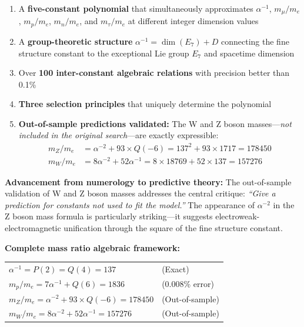 \documentclass[11pt,a4paper]{article}
\begin{document}
\begin{enumerate}
    \item A \textbf{five-constant polynomial} that simultaneously approximates $\alpha^{-1}$, $m_\mu/m_e$, $m_p/m_e$, $m_n/m_e$, and $m_\tau/m_e$ at different integer dimension values
    
    \item A \textbf{group-theoretic structure} $\alpha^{-1} = \dim(E_7) + D$ connecting the fine structure constant to the exceptional Lie group $E_7$ and spacetime dimension
    
    \item Over \textbf{100 inter-constant algebraic relations} with precision better than 0.1\%
    
    \item \textbf{Three selection principles} that uniquely determine the polynomial
    
    \item \textbf{Out-of-sample predictions validated:} The W and Z boson masses---\textit{not included in the original search}---are exactly expressible:
    \begin{align*}
    m_Z/m_e &= \alpha^{-2} + 93 \times Q(-6) = 137^2 + 93 \times 1717 = 178450 \\
    m_W/m_e &= 8\alpha^{-2} + 52\alpha^{-1} = 8 \times 18769 + 52 \times 137 = 157276
    \end{align*}
\end{enumerate}

\textbf{Advancement from numerology to predictive theory:} The out-of-sample validation of W and Z boson masses addresses the central critique: \textit{``Give a prediction for constants not used to fit the model.''} The appearance of $\alpha^{-2}$ in the Z boson mass formula is particularly striking---it suggests electroweak-electromagnetic unification through the square of the fine structure constant.

\textbf{Complete mass ratio algebraic framework:}
\begin{center}
\begin{tabular}{ll}
$\alpha^{-1} = P(2) = Q(4) = 137$ & (Exact) \\
$m_p/m_e = 7\alpha^{-1} + Q(6) = 1836$ & (0.008\% error) \\
$m_Z/m_e = \alpha^{-2} + 93 \times Q(-6) = 178450$ & (Out-of-sample) \\
$m_W/m_e = 8\alpha^{-2} + 52\alpha^{-1} = 157276$ & (Out-of-sample)
\end{tabular}
\end{center}
\end{document}
